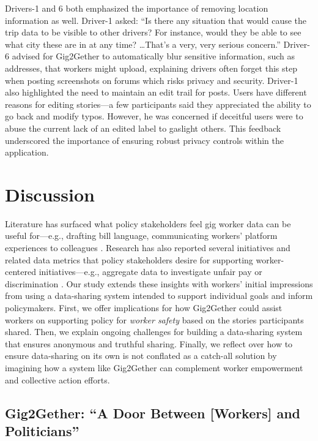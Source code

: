 Drivers-1 and 6 both emphasized the importance of removing location information as well. Driver-1 asked: ``Is there any situation that would cause the trip data to be visible to other drivers? For instance, would they be able to see what city these are in at any time? \dots That's a very, very serious concern.'' Driver-6 advised for Gig2Gether to automatically blur sensitive information, such as addresses, that workers might upload, explaining drivers often forget this step when posting screenshots on forums which risks privacy and security. Driver-1 also highlighted the need to maintain an edit trail for posts. Users have different reasons for editing stories---a few participants said they appreciated the ability to go back and modify typos. However, he was concerned if deceitful users were to abuse the current lack of an edited label to gaslight others.
This feedback underscored the importance of ensuring robust privacy controls within the application. 

\section{Discussion}

{Literature has surfaced what policy stakeholders feel gig worker data can be useful for---e.g., drafting bill language, communicating workers' platform experiences to colleagues \cite{zhang2024data}. Research has also reported several initiatives and related data metrics that policy stakeholders desire for supporting worker-centered initiatives---e.g., aggregate data to investigate unfair pay or discrimination \cite{supporting}. Our study extends these insights with workers' initial impressions from using a data-sharing system intended to support individual goals and inform policymakers. First, we offer implications for how Gig2Gether could assist workers on supporting policy for \textit{worker safety} based on the stories participants shared. Then, we explain ongoing challenges for building a data-sharing system that ensures anonymous and truthful sharing. Finally, we reflect over how to ensure data-sharing on its own is not conflated as a catch-all solution by imagining how a system like Gig2Gether can complement worker empowerment and collective action efforts.

}
\subsection{Gig2Gether: ``A Door Between [Workers] and Politicians''} \label{door}

